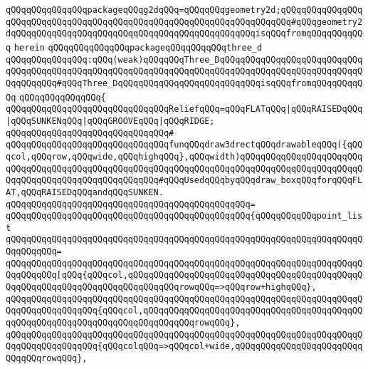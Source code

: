 \verb|qQQqqQQqqQQqqQQqpackageqQQqg2dqQQq=qQQqqQQqgeometry2d;qQQqqQQqqQQqqQQqqQQqqQQqqQQqqQQqqQQqqQQqqQQqqQQqqQQqqQQqqQQqqQQqqQQqqQQq#qQQqgeometry2dqQQqqQQqqQQqqQQqqQQqqQQqqQQqqQQqqQQqqQQqqQQqqQQqisqQQqfromqQQqqQQqqQQq|\newline
\verb|herein|\newline
\newline
\verb|qQQqqQQqqQQqqQQqpackageqQQqqQQqqQQqthree_d|\newline
\verb|qQQqqQQqqQQqqQQq:qQQq(weak)qQQqqQQqThree_DqQQqqQQqqQQqqQQqqQQqqQQqqQQqqQQqqQQqqQQqqQQqqQQqqQQqqQQqqQQqqQQqqQQqqQQqqQQqqQQqqQQqqQQqqQQqqQQqqQQqqQQqqQQq#qQQqThree_DqQQqqQQqqQQqqQQqqQQqqQQqqQQqisqQQqfromqQQqqQQqqQQq|\newline
\verb|qQQqqQQqqQQqqQQq{|\newline
\verb|qQQqqQQqqQQqqQQqqQQqqQQqqQQqqQQqReliefqQQq=qQQqFLATqQQq|\verb#|qQQqRAISEDqQQq|qQQqSUNKENqQQq|qQQqGROOVEqQQq|qQQqRIDGE;#\newline
\verb|qQQqqQQqqQQqqQQqqQQqqQQqqQQqqQQq#|\newline
\verb|qQQqqQQqqQQqqQQqqQQqqQQqqQQqqQQqfunqQQqdraw3drectqQQqdrawableqQQq({qQQqcol,qQQqrow,qQQqwide,qQQqhighqQQq},qQQqwidth)qQQqqQQqqQQqqQQqqQQqqQQqqQQqqQQqqQQqqQQqqQQqqQQqqQQqqQQqqQQqqQQqqQQqqQQqqQQqqQQqqQQqqQQqqQQqqQQqqQQqqQQqqQQqqQQqqQQqqQQqqQQq#qQQqUsedqQQqbyqQQqdraw_boxqQQqforqQQqFLAT,qQQqRAISEDqQQqandqQQqSUNKEN.|\newline
\verb|qQQqqQQqqQQqqQQqqQQqqQQqqQQqqQQqqQQqqQQqqQQqqQQq=|\newline
\verb|qQQqqQQqqQQqqQQqqQQqqQQqqQQqqQQqqQQqqQQqqQQqqQQq{qQQqqQQqqQQqpoint_list|\newline
\verb|qQQqqQQqqQQqqQQqqQQqqQQqqQQqqQQqqQQqqQQqqQQqqQQqqQQqqQQqqQQqqQQqqQQqqQQqqQQqqQQq=|\newline
\verb|qQQqqQQqqQQqqQQqqQQqqQQqqQQqqQQqqQQqqQQqqQQqqQQqqQQqqQQqqQQqqQQqqQQqqQQqqQQqqQQq[qQQq{qQQqcol,qQQqqQQqqQQqqQQqqQQqqQQqqQQqqQQqqQQqqQQqqQQqqQQqqQQqqQQqqQQqqQQqqQQqqQQqqQQqqQQqrowqQQq=>qQQqrow+highqQQq},|\newline
\verb|qQQqqQQqqQQqqQQqqQQqqQQqqQQqqQQqqQQqqQQqqQQqqQQqqQQqqQQqqQQqqQQqqQQqqQQqqQQqqQQqqQQqqQQq{qQQqcol,qQQqqQQqqQQqqQQqqQQqqQQqqQQqqQQqqQQqqQQqqQQqqQQqqQQqqQQqqQQqqQQqqQQqqQQqqQQqqQQqrowqQQq},|\newline
\verb|qQQqqQQqqQQqqQQqqQQqqQQqqQQqqQQqqQQqqQQqqQQqqQQqqQQqqQQqqQQqqQQqqQQqqQQqqQQqqQQqqQQqqQQq{qQQqcolqQQq=>qQQqcol+wide,qQQqqQQqqQQqqQQqqQQqqQQqqQQqqQQqrowqQQq},|\newline
